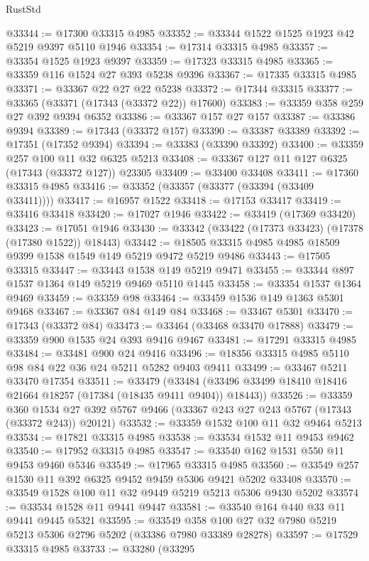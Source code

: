 \begin{lexlean}{RustStd}
\begin{coremodule}
@33344 := @17300 @33315 @4985
@33352 := @33344 @1522 @1525 @1923 @42 @5219 @9397 @5110 @1946
@33354 := @17314 @33315 @4985
@33357 := @33354 @1525 @1923 @9397
@33359 := @17323 @33315 @4985
@33365 := @33359 @116 @1524 @27 @393 @5238 @9396
@33367 := @17335 @33315 @4985
@33371 := @33367 @22 @27 @22 @5238
@33372 := @17344 @33315
@33377 := @33365 (@33371 (@17343 (@33372 @22)) @17600)
@33383 := @33359 @358 @259 @27 @392 @9394 @6352
@33386 := @33367 @157 @27 @157
@33387 := @33386 @9394
@33389 := @17343 (@33372 @157)
@33390 := @33387 @33389
@33392 := @17351 (@17352 @9394)
@33394 := @33383 (@33390 @33392)
@33400 := @33359 @257 @100 @11 @32 @6325 @5213
@33408 := @33367 @127 @11 @127 @6325 (@17343 (@33372 @127)) @23305
@33409 := @33400 @33408
@33411 := @17360 @33315 @4985
@33416 := @33352 (@33357 (@33377 (@33394 (@33409 @33411))))
@33417 := @16957 @1522
@33418 := @17153 @33417
@33419 := @33416 @33418
@33420 := @17027 @1946
@33422 := @33419 (@17369 @33420)
@33423 := @17051 @1946
@33430 := @33342 (@33422 (@17373 @33423) (@17378 (@17380 @1522)) @18443)
@33442 := @18505 @33315 @4985 @4985 @18509 @9399 @1538 @1549 @149 @5219 @9472 @5219 @9486
@33443 := @17505 @33315
@33447 := @33443 @1538 @149 @5219 @9471
@33455 := @33344 @897 @1537 @1364 @149 @5219 @9469 @5110 @1445
@33458 := @33354 @1537 @1364 @9469
@33459 := @33359 @98
@33464 := @33459 @1536 @149 @1363 @5301 @9468
@33467 := @33367 @84 @149 @84
@33468 := @33467 @5301
@33470 := @17343 (@33372 @84)
@33473 := @33464 (@33468 @33470 @17888)
@33479 := @33359 @900 @1535 @24 @393 @9416 @9467
@33481 := @17291 @33315 @4985
@33484 := @33481 @900 @24 @9416
@33496 := @18356 @33315 @4985 @5110 @98 @84 @22 @36 @24 @5211 @5282 @9403 @9411
@33499 := @33467 @5211 @33470 @17354
@33511 := @33479
    (@33484 (@33496 @33499 @18410 @18416 @21664 @18257 (@17384 (@18435 @9411 @9404)) @18443))
@33526 := @33359
    @360
    @1534
    @27
    @392
    @5767
    @9466
    (@33367 @243 @27 @243 @5767 (@17343 (@33372 @243)) @20121)
@33532 := @33359 @1532 @100 @11 @32 @9464 @5213
@33534 := @17821 @33315 @4985
@33538 := @33534 @1532 @11 @9453 @9462
@33540 := @17952 @33315 @4985
@33547 := @33540 @162 @1531 @550 @11 @9453 @9460 @5346
@33549 := @17965 @33315 @4985
@33560 := @33549 @257 @1530 @11 @392 @6325 @9452 @9459 @5306 @9421 @5202 @33408
@33570 := @33549 @1528 @100 @11 @32 @9449 @5219 @5213 @5306 @9430 @5202
@33574 := @33534 @1528 @11 @9441 @9447
@33581 := @33540 @164 @440 @33 @11 @9441 @9445 @5321
@33595 := @33549 @358 @100 @27 @32 @7980 @5219 @5213 @5306 @2796 @5202 (@33386 @7980 @33389 @28278)
@33597 := @17529 @33315 @4985
@33733 := @33280
    (@33295

\end{coremodule}
\end{lexlean}
